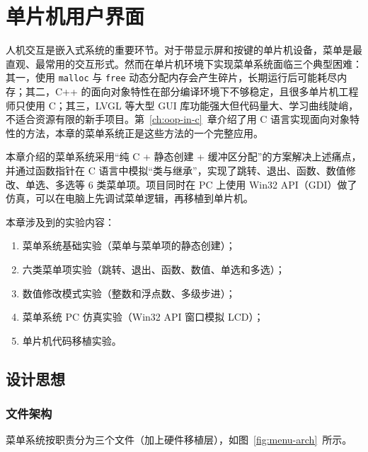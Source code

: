 \chapter{单片机用户界面} \label{ch:menu-system}

人机交互是嵌入式系统的重要环节。对于带显示屏和按键的单片机设备，菜单是最直观、最常用的交互形式。然而在单片机环境下实现菜单系统面临三个典型困难：其一，使用 \texttt{malloc} 与 \texttt{free} 动态分配内存会产生碎片，长期运行后可能耗尽内存；其二，C++ 的面向对象特性在部分编译环境下不够稳定，且很多单片机工程师只使用 C；其三，LVGL 等大型 GUI 库功能强大但代码量大、学习曲线陡峭，不适合资源有限的新手项目。第~\ref{ch:oop-in-c}~章介绍了用 C 语言实现面向对象特性的方法，本章的菜单系统正是这些方法的一个完整应用。

本章介绍的菜单系统采用“纯 C + 静态创建 + 缓冲区分配”的方案解决上述痛点，并通过函数指针在 C 语言中模拟“类与继承”，实现了跳转、退出、函数、数值修改、单选、多选等 6 类菜单项。项目同时在 PC 上使用 Win32 API（GDI）做了仿真，可以在电脑上先调试菜单逻辑，再移植到单片机。

\medskip 本章涉及到的实验内容：
\begin{enumerate}
\item 菜单系统基础实验（菜单与菜单项的静态创建）；
\item 六类菜单项实验（跳转、退出、函数、数值、单选和多选）；
\item 数值修改模式实验（整数和浮点数、多级步进）；
\item 菜单系统 PC 仿真实验（Win32 API 窗口模拟 LCD）；
\item 单片机代码移植实验。
\end{enumerate}

\section{设计思想}

\subsection{文件架构}

菜单系统按职责分为三个文件（加上硬件移植层），如图~\ref{fig:menu-arch}~所示。

